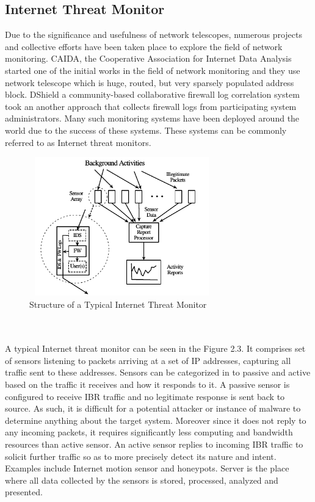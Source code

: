     \subsection{Internet Threat Monitor}
	Due to the significance and usefulness of network telescopes, numerous projects and collective efforts have been taken place to explore the field of network monitoring.
	CAIDA, the Cooperative Association for Internet Data Analysis \cite{caida} started one of the initial works in the field of network monitoring and they use network telescope which is huge, routed, but very sparsely populated address block. 
    DShield \cite{dshield} a community-based collaborative firewall log correlation system took an another approach that collects firewall logs from participating system administrators.
    Many such monitoring systems have been deployed around the world due to the success of these systems.
    These systems can be commonly referred to as Internet threat monitors.
    \begin{figure}[t]
    \centering
	\includegraphics[width=8cm, height=6cm]{images/int_threat_mon}
	\caption{ Structure of a Typical Internet Threat Monitor \protect\cite{caida}}
	\end{figure}
	\\\\
	A typical Internet threat monitor can be seen in the Figure 2.3. 
	It comprises set of sensors listening to packets arriving at a set of IP addresses, capturing all traffic sent to these addresses.
	Sensors can be categorized in to passive and active based on the traffic it receives and how it responds to it.
	A passive sensor is configured to receive IBR traffic and no legitimate response is sent back to source.
	As such, it is difficult for a potential attacker or instance of malware to determine anything about the target system.
	Moreover since it does not reply to any incoming packets, it requires significantly less computing and bandwidth resources than active sensor.
	An active sensor replies to incoming IBR traffic to solicit further  traffic  so  as  to  more  precisely detect  its  nature  and intent.
	Examples include Internet motion sensor \cite{cooke2004internet} and honeypots.
	Server is the place where all data collected by the sensors is  stored, processed, analyzed and presented.
